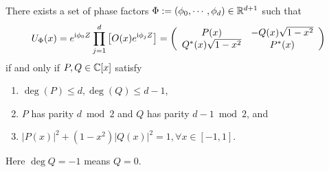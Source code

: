 \begin{thm}\label{thm:qsp}
There exists a set of phase factors $\Phi := (\phi_0, \cdots, \phi_d) \in \mathbb{R}^{d+1}$ such that
\begin{equation}
  U_{\Phi}(x) = e^{\mathrm{i} \phi_0 Z} \prod_{j=1}^{d} \left[ O(x) e^{\mathrm{i} \phi_j Z} \right] = \left( \begin{array}{cc}
    P(x) & -Q(x) \sqrt{1 - x^2}\\
    Q^*(x) \sqrt{1 - x^2} & P^*(x)
  \end{array} \right)
  \label{eqn:QSP_representation}
\end{equation}
if and only if $P,Q\in\mathbb{C}[x]$ satisfy
\begin{enumerate}

\item $\deg(P) \leq d, \deg(Q) \leq d-1$,

\item $P$ has parity $d \bmod 2$ and $Q$ has parity $d-1 \bmod 2$, and

\item $|P(x)|^2 + (1-x^2) |Q(x)|^2 = 1, \forall x \in [-1, 1]$.
\end{enumerate}
Here $\deg Q=-1$ means $Q=0$.
\end{thm}
